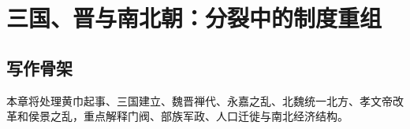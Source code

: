 \chapter{三国、晋与南北朝：分裂中的制度重组}
\section{写作骨架}
本章将处理黄巾起事、三国建立、魏晋禅代、永嘉之乱、北魏统一北方、孝文帝改革和侯景之乱，重点解释门阀、部族军政、人口迁徙与南北经济结构。
